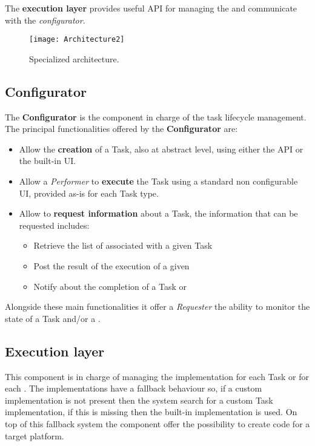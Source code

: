 The \textbf{execution layer} provides useful API for managing the \utask{} and
communicate with the \emph{configurator}.

\begin{figure}[tb]
	\centering
	\texttt{[image: Architecture2]}
	\caption{Specialized architecture.}
	\label{fig:architecture2}
\end{figure}





\subsection{Configurator}\label{sec:configurator}
The \textbf{Configurator} is the component in charge of the task lifecycle
management. The principal functionalities offered by the \textbf{Configurator}
are:
\begin{itemize}
	\item Allow the \textbf{creation} of a Task, also at abstract level, using
	either the API or the built-in UI.

	\item Allow a \emph{Performer} to \textbf{execute} the Task using a standard
	non configurable UI, provided as-is for each Task type.

	\item Allow to \textbf{request information} about a Task, the information
	that can be requested includes:
	\begin{itemize}
		\item Retrieve the list of \utask{} associated with a given Task

		\item Post the result of the execution of a given \utask{}

		\item Notify about the completion of a Task or \utask{}
	\end{itemize}
\end{itemize}

Alongside these main functionalities it offer a \emph{Requester} the ability to
monitor the state of a Task and/or a \utask{}.




\subsection{Execution layer}\label{sec:exec-layer}
This component is in charge of managing the \utask{} implementation for each Task
or for each \utask{}. The implementations have a fallback behaviour so, if a
custom \utask{} implementation is not present then the system search for a
custom Task implementation, if this is missing then the built-in implementation
is used. On top of this fallback system the component offer the possibility to
create code for a target platform.

